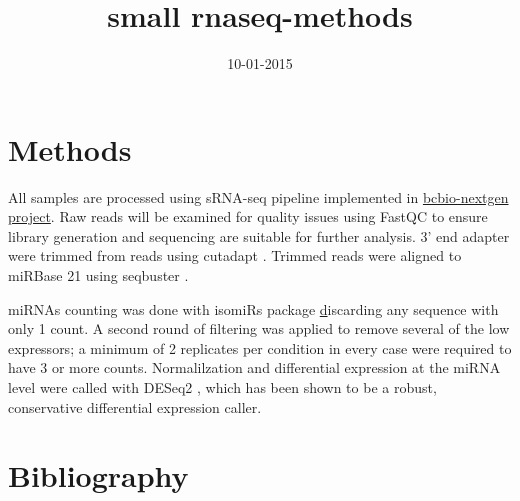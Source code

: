 \documentclass[11pt]{article}
\date{10-01-2015}
\title{small rnaseq-methods}
\begin{document}
\maketitle

\section{Methods}

All samples are processed using sRNA-seq pipeline implemented in
\href{http://bcbio-nextgen.readthedocs.org/en/latest/}{bcbio-nextgen project}.
Raw reads will be examined for quality
issues using FastQC to ensure library generation and sequencing are
suitable for further analysis. 3' end adapter were trimmed from reads using
cutadapt \cite{Martin:2011va}. Trimmed reads were aligned to miRBase
21 \cite{Kozomara2014} using seqbuster \cite{Pantano2010}.

miRNAs counting was done with isomiRs package \href{http://github.com/lpantano/isomiRs} discarding any sequence with only 1 count. A second round of filtering was applied to remove several of the low expressors; a minimum of 2 replicates per condition in every case were required to have 3 or more counts. Normalilzation and differential expression at the miRNA level were called with
DESeq2 \cite{Love:2014do}, which has been shown to be a robust,
conservative differential expression caller.

\section{Bibliography}


\end{document}
